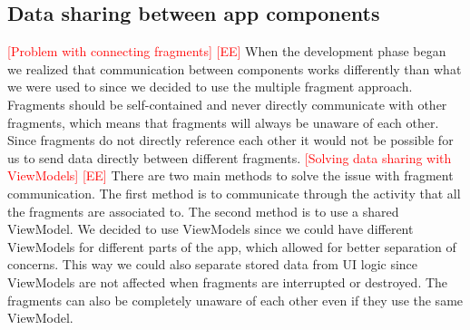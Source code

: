 \documentclass[acmlarge, review=false, screen=true]{acmart}
\begin{document}
    \subsection{Data sharing between app components}
      \textcolor{red}{[Problem with connecting fragments] [EE]} \newline
      When the development phase began we realized that communication between components works differently than what we were used to since we decided to use the multiple fragment approach. Fragments should be self-contained and never directly communicate with other fragments\cite{fragmentcommunication}, which means that fragments will always be unaware of each other. Since fragments do not directly reference each other it would not be possible for us to send data directly between different fragments.
\newline\newline
      \textcolor{red}{[Solving data sharing with ViewModels] [EE]} \newline
      There are two main methods to solve the issue with fragment communication. The first method is to communicate through the activity that all the fragments are associated to. The second method is to use a shared ViewModel. We decided to use ViewModels since we could have different ViewModels for different parts of the app, which allowed for better separation of concerns. This way we could also separate stored data from UI logic since ViewModels are not affected when fragments are interrupted or destroyed\cite{viewmodel}. The fragments can also be completely unaware of each other even if they use the same ViewModel.
\end{document}
